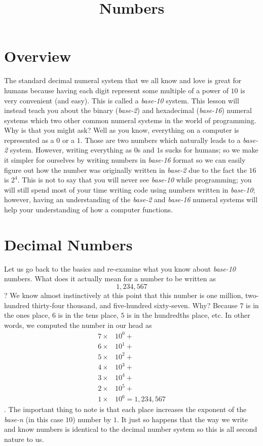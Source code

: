 \documentclass{article}
\title{Numbers}
\begin{document}
\maketitle

\section{Overview}

The standard decimal numeral system that we all know and love is great for humans because having each digit represent some multiple of a power of $10$ is very convenient (and easy).
This is called a \textit{base-10} system.
This lesson will instead teach you about the binary (\textit{base-2}) and hexadecimal (\textit{base-16}) numeral systems which two other common numeral systems in the world of programming.
Why is that you might ask?
Well as you know, everything on a computer is represented as a $0$ or a $1$. 
Those are two numbers which naturally leads to a \textit{base-2} system.
However, writing everything as $0$s and $1$s sucks for humans; so we make it simpler for ourselves by writing numbers in \textit{base-16} format so we can easily figure out how the number was originally written in \textit{base-2} due to the fact the $16$ is $2^4$.
This is not to say that you will never see \textit{base-10} while programming; you will still spend most of your time writing code using numbers written in \textit{base-10}; however, having an understanding of the \textit{base-2} and \textit{base-16} numeral systems will help your understanding of how a computer functions.

\section{Decimal Numbers}

Let us go back to the basics and re-examine what you know about \textit{base-10} numbers.
What does it actually mean for a number to be written as
\begin{equation}
1, 234, 567
\end{equation}
?
We know almost instinctively at this point that this number is one million, two-hundred thirty-four thousand, and five-hundred sixty-seven.
Why?
Because $7$ is in the ones place, $6$ is in the tens place, $5$ is in the hundredths place, etc.
In other words, we computed the number in our head as
\begin{align}
7 \times & 10^0 + \\
6 \times & 10^1 + \\
5 \times & 10^2 + \\
4 \times & 10^3 + \\
3 \times & 10^4 + \\
2 \times & 10^5 + \\
1 \times & 10^6 = 1,234,567
\end{align}
.
The important thing to note is that each place increases the exponent of the \textit{base-n} (in this case $10$) number by $1$.
It just so happens that the way we write and know numbers is identical to the decimal number system so this is all second nature to us.
\end{document}
